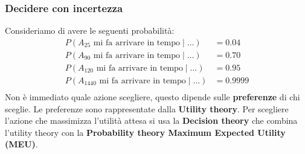 \documentclass[a4paper]{article}
\begin{document}
\subsubsection{Decidere con incertezza}
Consideriamo di avere le seguenti probabilità:
\[
  \begin{aligned}
    P(A_25 \text{ mi fa arrivare in tempo} \;|\; \ldots) & = 0.04 \\
    P(A_90 \text{ mi fa arrivare in tempo} \;|\; \ldots) & = 0.70 \\
    P(A_120 \text{ mi fa arrivare in tempo} \;|\; \ldots) & = 0.95 \\
    P(A_1440 \text{ mi fa arrivare in tempo} \;|\; \ldots) & = 0.9999 \\
  \end{aligned}
\] 
Non è immediato quale azione scegliere, questo dipende sulle \textbf{preferenze} di
chi sceglie. Le preferenze sono rappresentate dalla \textbf{Utility theory}. Per scegliere
l'azione che massimizza l'utilità attesa si usa la \textbf{Decision theory} che combina
l'utility theory con la \textbf{Probability theory Maximum Expected Utility (MEU)}.
\end{document}
